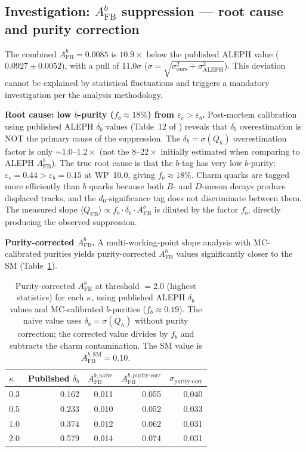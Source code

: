 \documentclass[11pt,a4paper]{article}
\begin{document}
\subsection{Investigation: $A_\mathrm{FB}^b$ suppression --- root cause and purity correction}
\label{sec:delta_b_investigation}

The combined $A_\mathrm{FB}^b = 0.0085$ is $10.9\times$ below the published ALEPH
value ($0.0927 \pm 0.0052$), with a pull of $11.0\sigma$
($\sigma = \sqrt{\sigma_\mathrm{ours}^2 + \sigma_\mathrm{ALEPH}^2}$). This deviation cannot be
explained by statistical fluctuations and triggers a mandatory investigation per the
analysis methodology.

\textbf{Root cause: low $b$-purity ($f_b \approx 18\%$) from $\varepsilon_c > \varepsilon_b$.}
Post-mortem calibration using published ALEPH $\delta_b$ values (Table~12 of
\cite{ALEPH:AFBb}) reveals that $\delta_b$ overestimation is NOT the primary cause
of the suppression. The $\delta_b = \sigma(Q_h)$ overestimation factor is only
$\sim 1.0$--$1.2\times$ (not the $8$--$22\times$ initially estimated when comparing
to ALEPH $A_\mathrm{FB}^b$). The true root cause is that the $b$-tag has very low
$b$-purity: $\varepsilon_c = 0.44 > \varepsilon_b = 0.15$ at WP~10.0, giving
$f_b \approx 18\%$. Charm quarks are tagged more efficiently than $b$ quarks because
both $B$- and $D$-meson decays produce displaced tracks, and the $d_0$-significance
tag does not discriminate between them. The measured slope
$\langle Q_\mathrm{FB} \rangle \propto f_b \cdot \delta_b \cdot A_\mathrm{FB}^b$
is diluted by the factor $f_b$, directly producing the observed suppression.

\textbf{Purity-corrected $A_\mathrm{FB}^b$.}
A multi-working-point slope analysis with MC-calibrated purities yields
purity-corrected $A_\mathrm{FB}^b$ values significantly closer to the SM
(Table~\ref{tab:afb_purity_corrected}).

\begin{table}[htbp]
\centering
\caption{Purity-corrected $A_\mathrm{FB}^b$ at threshold $= 2.0$ (highest statistics)
for each $\kappa$, using published ALEPH $\delta_b$ values and MC-calibrated
$b$-purities ($f_b \approx 0.19$). The naive value uses $\delta_b = \sigma(Q_h)$
without purity correction; the corrected value divides by $f_b$ and subtracts the
charm contamination. The SM value is $A_\mathrm{FB}^{b,\mathrm{SM}} = 0.10$.}
\label{tab:afb_purity_corrected}
\begin{tabular}{lrrrr}
\toprule
$\kappa$ & Published $\delta_b$ & $A_\mathrm{FB}^{b,\mathrm{naive}}$ & $A_\mathrm{FB}^{b,\mathrm{purity\text{-}corr}}$ & $\sigma_\mathrm{purity\text{-}corr}$ \\
\midrule
0.3 & 0.162 & 0.011 & 0.055 & 0.040 \\
0.5 & 0.233 & 0.010 & 0.052 & 0.033 \\
1.0 & 0.374 & 0.012 & 0.062 & 0.031 \\
2.0 & 0.579 & 0.014 & 0.074 & 0.031 \\
\bottomrule
\end{tabular}
\end{table}
\end{document}
